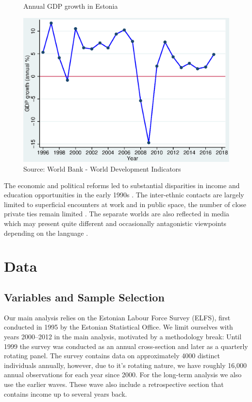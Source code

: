 \documentclass[12pt, a4paper]{article}
\begin{document}
\begin{figure}[h]
  \centering                      
  \caption{Annual GDP growth in Estonia}\label{fig:gdp_growth}
  \includegraphics[width=0.6\linewidth]{gdp_growth_per_year.eps}
  \caption*{Source: World Bank - World Development Indicators}
\end{figure}

The economic and political reforms led to substantial
disparities in income and education opportunities
in the early 1990s \citep{Leping2008,
	lindemann+saar2011Russian2ndGeneration}.  The inter-ethnic contacts
are largely limited to superficial encounters at work and in public
space, the number of close private ties remain limited
\citep{korts2009JofBaltStud}.  The
separate worlds are also reflected in media which may present quite
different and occasionally antagonistic viewpoints depending on the
language \citep{Korts2002}.


\section{Data}
\label{subsec:ss_var}

\subsection{Variables and Sample Selection}
\label{sec:variables}

Our main analysis relies on the Estonian Labour Force Survey (ELFS),
first conducted in 1995 by the Estonian Statistical Office.  We limit
ourselves with years 2000--2012 in the main analysis, motivated by a
methodology break: Until 1999 the survey was conducted as an annual
cross-section and later as a quarterly rotating panel.  The survey
contains data on approximately 4000 distinct individuals annually,
however, due to it's rotating nature, we have roughly 16,000 annual
observations for each year since 2000.  For the long-term analysis we
also use the earlier waves.  These wave also include a retrospective
section that contains income up to several years back.
\end{document}
